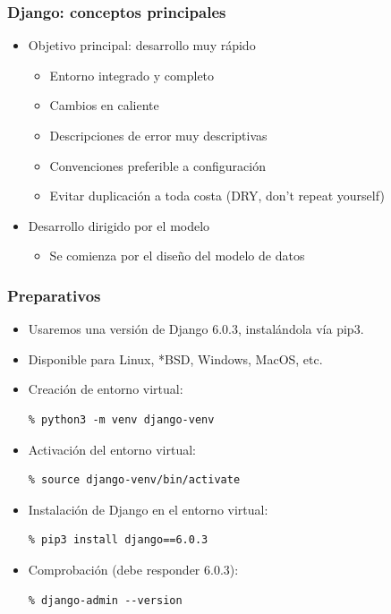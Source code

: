 \begin{frame}
\frametitle{Django: conceptos principales}

\begin{itemize}
\item Objetivo principal: desarrollo muy rápido
  \begin{itemize}
  \item Entorno integrado y completo
  \item Cambios en caliente
  \item Descripciones de error muy descriptivas
  \item Convenciones preferible a configuración
  \item Evitar duplicación a toda costa (DRY, don't repeat yourself)
  \end{itemize}
\item Desarrollo dirigido por el modelo
  \begin{itemize}
  \item Se comienza por el diseño del modelo de datos
  \end{itemize}
\end{itemize}

\end{frame}


\begin{frame}[fragile]
\frametitle{Preparativos}

\begin{itemize}
\item Usaremos una versión de Django 6.0.3, instalándola vía pip3.
\item Disponible para Linux, *BSD, Windows, MacOS, etc.
\item Creación de entorno virtual:

\begin{verbatim}
% python3 -m venv django-venv    
\end{verbatim}

\item Activación del entorno virtual:

\begin{verbatim}
% source django-venv/bin/activate
\end{verbatim}

\item Instalación de Django en el entorno virtual:

\begin{verbatim}
% pip3 install django==6.0.3
\end{verbatim}

\item Comprobación (debe responder 6.0.3):
\begin{verbatim}
% django-admin --version
\end{verbatim}
\end{itemize}


\end{frame}


